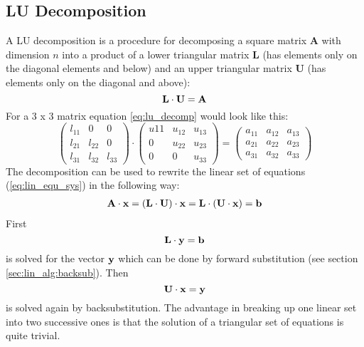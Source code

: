 \subsection{LU Decomposition}
\label{sec:lin_alg:lu_decomp}

A LU decomposition is a procedure for decomposing a square matrix {\bf
  A} with
dimension $n$ into a product of a lower triangular matrix {\bf L} (has
elements only on the diagonal elements and below) and
an upper triangular matrix {\bf U} (has elements only on the diagonal
and above):
\begin{equation}
  \label{eq:lu_decomp}
  {\bf L}\cdot{\bf U} ={\bf A} 
\end{equation}
For a 3 x 3 matrix equation \ref{eq:lu_decomp} would look like this: 
\[ \left(
  \begin{array}{ccc}
    l_{11} & 0 & 0 \\
    l_{21} & l_{22} & 0 \\
    l_{31} & l_{32} & l_{33}
    \end{array} \right)
\cdot
\left(
  \begin{array}{ccc}
    u{11} & u_{12} & u_{13} \\
    0 & u_{22} & u_{23}\\
    0 & 0 & u_{33}
    \end{array} \right)
=
\left(
  \begin{array}{ccc}
    a_{11} & a_{12} & a_{13} \\
    a_{21} & a_{22} & a_{23} \\
    a_{31} & a_{32} & a_{33}
    \end{array} \right)
\]
The decomposition can be used to rewrite the linear set of equations
(\ref{eq:lin_equ_sys}) in the following way:
\begin{eqnarray}
  {\bf A}\cdot{\bf x} = ({\bf L}\cdot{\bf U})\cdot{\bf x} = {\bf
    L}\cdot({\bf U}\cdot{\bf x}) = {\bf b}
\end{eqnarray}
First 
\begin{equation}
  {\bf L} \cdot{\bf y} = {\bf b}
\end{equation}
is solved for the vector ${\bf y}$ which can be done by
forward substitution (see section \ref{sec:lin_alg:backsub}). Then 
\begin{equation}
  {\bf U} \cdot{\bf x} = {\bf y}
\end{equation}
is solved again by backsubstitution. 
The advantage in breaking up one linear set into two successive ones
is that the solution of a triangular set of equations is quite trivial.

